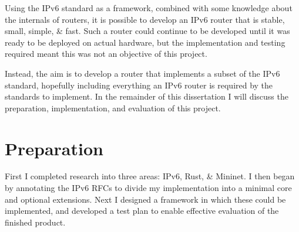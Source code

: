 \documentclass[12pt,a4paper,twoside,openany]{report}
\begin{document}
\bigskip

Using the IPv6 standard as a framework, combined with some knowledge about the internals of routers, it is possible to develop an IPv6 router that is stable, small, simple, \& fast.  Such a router could continue to be developed until it was ready to be deployed on actual hardware, but the implementation and testing required meant this was not an objective of this project.  

Instead, the aim is to develop a router that implements a subset of the IPv6 standard, hopefully including everything an IPv6 router is required by the standards to implement.  In the remainder of this dissertation I will discuss the preparation, implementation, and evaluation of this project.

\chapter{Preparation}
\label{chap::preparation}

First I completed research into three areas: IPv6, Rust, \& Mininet. I then began by annotating the IPv6 RFCs\cite{ipv6_rfc}\cite{ipv6_rfc_adr}\cite{icmpv6_rfc} to divide my implementation into a minimal core and optional extensions. Next I designed a framework in which these could be implemented, and developed a test plan to enable effective evaluation of the finished product.
\end{document}
